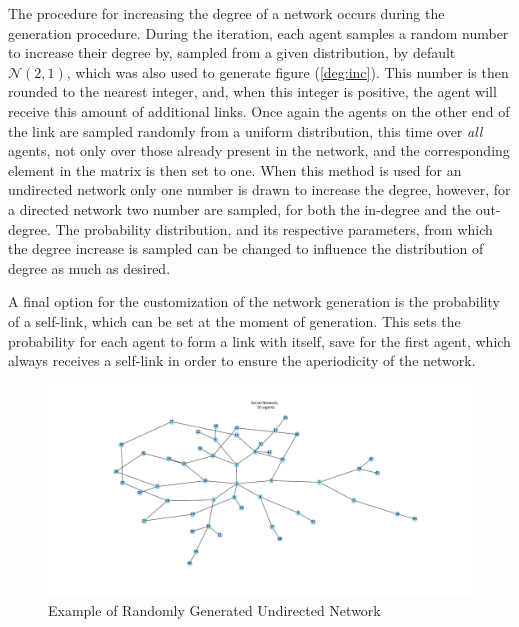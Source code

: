 \documentclass{article}
\begin{document}
\newpage

The procedure for increasing the degree of a network occurs during the generation procedure. During the iteration, each agent samples a random number to increase their degree by, sampled from a given distribution, by default $\mathcal{N}(2,1)$, which was also used to generate figure (\ref{deg:inc}). This number is then rounded to the nearest integer, and, when this integer is positive, the agent will receive this amount of additional links. Once again the agents on the other end of the link are sampled randomly from a uniform distribution, this time over \emph{all} agents, not only over those already present in the network, and the corresponding element in the matrix is then set to one. When this method is used for an undirected network only one number is drawn to increase the degree, however, for a directed network two number are sampled, for both the in-degree and the out-degree.
The probability distribution, and its respective parameters, from which the degree increase is sampled can be changed to influence the distribution of degree as much as desired.
\newline

A final option for the customization of the network generation is the probability of a self-link, which can be set at the moment of generation. This sets the probability for each agent to form a link with itself, save for the first agent, which always receives a self-link in order to ensure the aperiodicity of the network.
\begin{center}
    \begin{figure}[!htbp]
        \centering
        \includegraphics[width=1.1\textwidth]{ThesisKI/Images/NoneGraphRandom.png}
        \caption{Example of Randomly Generated Undirected Network}
        \label{network:random}
    \end{figure}
\end{center}
\end{document}
